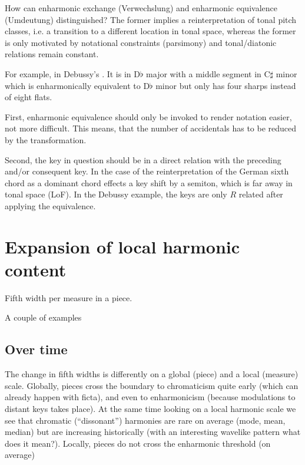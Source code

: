 \documentclass[letterpaper,10pt,english]{sphinxmanual}
\begin{document}
\sphinxAtStartPar
How can enharmonic exchange (Verwechslung) and enharmonic equivalence
(Umdeutung) distinguished? The former implies a reinterpretation of
tonal pitch classes, i.e. a transition to a different location in tonal
space, whereas the former is only motivated by notational constraints
(parsimony) and tonal/diatonic relations remain constant.

\sphinxAtStartPar
For example, in Debussy’s . It is in D\(\flat\)
major with a middle segment in C\(\sharp\) minor which is
enharmonically equivalent to D\(\flat\) minor but only has four
sharps instead of eight flats.

\sphinxAtStartPar
First, enharmonic equivalence should only be invoked to render notation
easier, not more difficult. This means, that the number of accidentals
has to be reduced by the transformation.

\sphinxAtStartPar
Second, the key in question should be in a direct relation with the
preceding and/or consequent key. In the case of the reinterpretation of
the German sixth chord as a dominant chord effects a key shift by a
semiton, which is far away in tonal space (LoF). In the Debussy example,
the keys are only \(R\) related after applying the equivalence.


\section{Expansion of local harmonic content}
\label{\detokenize{diatonicism_chromaticism:expansion-of-local-harmonic-content}}
\sphinxAtStartPar
Fifth width per measure in a piece.

\sphinxAtStartPar
A couple of examples


\subsection{Over time}
\label{\detokenize{diatonicism_chromaticism:over-time}}
\sphinxAtStartPar
The change in fifth widths is differently on a global (piece) and a
local (measure) scale. Globally, pieces cross the boundary to
chromaticism quite early (which can already happen with ficta), and even
to enharmonicism (because modulations to distant keys takes place). At
the same time looking on a local harmonic scale we see that chromatic
(“dissonant”) harmonies are rare on average (mode, mean, median) but are
increasing historically (with an interesting wavelike pattern \sphinxhyphen{} what
does it mean?). Locally, pieces do not cross the enharmonic threshold
(on average)
\end{document}
